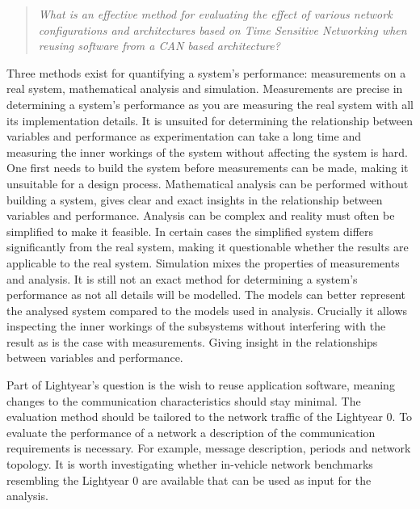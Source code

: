 \begin{quote}
    \emph{What is an effective method for evaluating the effect of various network configurations and architectures based on Time Sensitive Networking when reusing software from a CAN based architecture?}
\end{quote}

Three methods exist for quantifying a system's performance: measurements on a real system, mathematical analysis and simulation. Measurements are precise in determining a system's performance as you are measuring the real system with all its implementation details. It is unsuited for determining the relationship between variables and performance as experimentation can take a long time and measuring the inner workings of the system without affecting the system is hard. One first needs to build the system before measurements can be made, making it unsuitable for a design process. Mathematical analysis can be performed without building a system, gives clear and exact insights in the relationship between variables and performance. Analysis can be complex and reality must often be simplified to make it feasible. In certain cases the simplified system differs significantly from the real system, making it questionable whether the results are applicable to the real system. Simulation mixes the properties of measurements and analysis. It is still not an exact method for determining a system's performance as not all details will be modelled. The models can better represent the analysed system compared to the models used in analysis. Crucially it allows inspecting the inner workings of the subsystems without interfering with the result as is the case with measurements. Giving insight in the relationships between variables and performance. 

Part of Lightyear's question is the wish to reuse application software, meaning changes to the communication characteristics should stay minimal. The evaluation method should be tailored to the network traffic of the Lightyear 0. To evaluate the performance of a network a description of the communication requirements is necessary. For example, message description, periods and network topology. It is worth investigating whether in-vehicle network benchmarks resembling the Lightyear 0 are available that can be used as input for the analysis.
